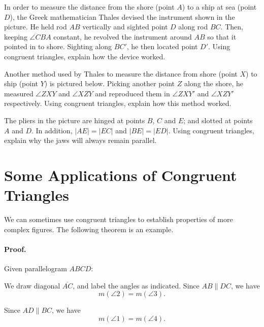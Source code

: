\documentclass[12pt]{book} %
\begin{document}
\begin{ExerciseList}

\Exercise In order to measure the distance from the shore (point $A$) to a ship at sea (point $D$), the Greek mathematician Thales devised the instrument shown in the picture. He held rod $AB$ vertically and sighted point $D$ along rod $BC$. Then, keeping $\angle CBA$ constant, he revolved the instrument around $AB$ so that it pointed in to shore. Sighting along $BC'$, he then located point $D'$. Using congruent triangles, explain how the device worked.


\Exercise Another method used by Thales to measure the distance from shore (point $X$) to ship (point $Y$) is pictured below. Picking another point $Z$ along the shore, he measured $\angle ZXY$ and $\angle XZY$ and reproduced them in $\angle ZXY'$ and $\angle XZY'$ respectively. Using congruent triangles, explain how this method worked.


\Exercise The pliers in the picture are hinged at points $B$, $C$ and $E$; and slotted at points $A$ and $D$. In addition, $|AE|=|EC|$ and $|BE|=|ED|$. Using congruent triangles, explain why the jaws will always remain parallel.

\end{ExerciseList}

\section{Some Applications of Congruent Triangles}

We can sometimes use congruent triangles to establish properties of more complex figures. The following theorem is an example.


\paragraph{Proof.}
Given parallelogram $ABCD$:


We draw diagonal $\overline{AC}$, and label the angles as indicated. Since $AB\parallel DC$, we have
\[
m(\angle 2)=m(\angle 3).
\]

Since $AD\parallel BC$, we have
\[
m(\angle 1)=m(\angle 4).
\]
\end{document}
